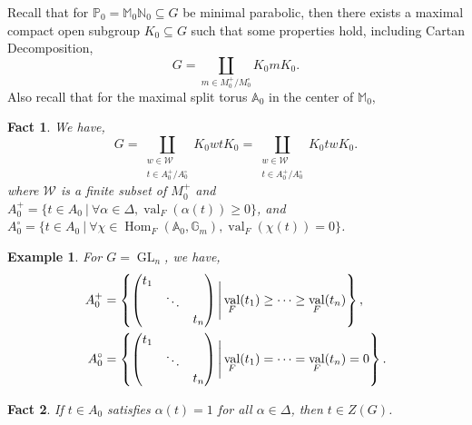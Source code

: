 \documentclass[8pt]{article}
\newtheorem{fact}{Fact}[section]
\newtheorem{example}{Example}[section]
\DeclareMathOperator{\GL}{GL}
\DeclareMathOperator{\Hom}{Hom}
\DeclareMathOperator{\val}{val}
\newcommand{\N}[0]{\mathbb{N}}
\newcommand{\A}[0]{\mathbb{A}}
\newcommand{\G}[0]{\mathbb{G}}
\newcommand{\Para}[0]{\mathbb{P}}
\newcommand{\M}[0]{\mathbb{M}}
\newcommand{\sep}[0]{\:|\:}
\begin{document}
Recall that for $\Para_0=\M_0\N_0 \subseteq G$ be minimal parabolic, then there exists a maximal compact open subgroup $K_0\subseteq G$ such that some properties hold, including Cartan Decomposition, 
\begin{equation*}
G = \coprod_{m\in M_0^+/M_0^\circ} K_0mK_0.
\end{equation*}
Also recall that for the maximal split torus $\A_0$ in the center of $\M_0$,
\begin{fact}
  We have,
  \begin{equation*}
    G=\coprod_{\substack{w\in\mathcal{W}\\t\in A_0^+/A_0^\circ}}K_0wtK_0=\coprod_{\substack{w\in\mathcal{W}\\t\in A_0^+/A_0^\circ}}K_0twK_0.
  \end{equation*}
  where $\mathcal{W}$ is a finite subset of $M_0^+$ and $A_0^+ = \{t\in A_0\sep \forall \alpha\in\Delta,\val_F(\alpha(t))\geq 0\}$, and 
  $A_0^\circ=\{t\in A_0\sep\forall \chi\in \Hom_F(\A_0,\G_m),\val_F(\chi(t))=0\}$.
\end{fact}
\begin{example}
  For $G=\GL_n$, we have,
  \begin{align*}
    A_0^+ &= \left\{\begin{pmatrix}
    t_1 & \: & \:\\
    \: & \ddots & \:\\
    \: & \: & t_n
    \end{pmatrix}\Bigg{|} \val_F(t_1)\geq\cdots\geq\val_F(t_n)\right\},\\
    A_0^\circ &= \left\{\begin{pmatrix}
    t_1 & \: & \:\\
    \: & \ddots & \:\\
    \: & \: & t_n
    \end{pmatrix}\Bigg{|} \val_F(t_1)=\cdots=\val_F(t_n)=0\right\}.
  \end{align*}
\end{example}
\begin{fact}
  If $t\in A_0$ satisfies $\alpha(t)=1$ for all $\alpha\in \Delta$, then $t\in Z(G)$.
\end{fact}
\end{document}
